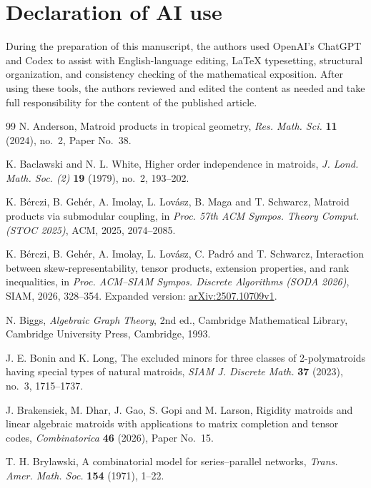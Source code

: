 \documentclass[12pt,a4paper]{article}
\numberwithin{equation}{section}
\theoremstyle{definition}
\theoremstyle{remark}
\begin{document}
\section*{Declaration of AI use}
During the preparation of this manuscript, the authors used OpenAI's ChatGPT and Codex to assist with English-language editing, \LaTeX{} typesetting, structural organization, and consistency checking of the mathematical exposition.  After using these tools, the authors reviewed and edited the content as needed and take full responsibility for the content of the published article.
\begin{thebibliography}{99}
\normalsize
{}
N. Anderson,
Matroid products in tropical geometry,
\emph{Res. Math. Sci.}
\textbf{11} (2024), no.~2, Paper No.~38.

K. Baclawski and N. L. White,
Higher order independence in matroids,
\emph{J. Lond. Math. Soc. (2)}
\textbf{19} (1979), no.~2, 193--202.

K. B\'erczi, B. Geh\'er, A. Imolay, L. Lov\'asz, B. Maga and T. Schwarcz,
Matroid products via submodular coupling,
in \emph{Proc. 57th ACM Sympos. Theory Comput. (STOC 2025)},
ACM, 2025, 2074--2085.

K. B\'erczi, B. Geh\'er, A. Imolay, L. Lov\'asz, C. Padr\'o and T. Schwarcz,
Interaction between skew-representability, tensor products, extension
properties, and rank inequalities,
in \emph{Proc. ACM--SIAM Sympos. Discrete Algorithms (SODA 2026)},
SIAM, 2026, 328--354.
Expanded version: \href{https://arxiv.org/abs/2507.10709v1}{arXiv:2507.10709v1}.

N. Biggs,
\emph{Algebraic Graph Theory}, 2nd ed.,
Cambridge Mathematical Library, Cambridge University Press, Cambridge, 1993.

J. E. Bonin and K. Long,
The excluded minors for three classes of 2-polymatroids having special
types of natural matroids,
\emph{SIAM J. Discrete Math.}
\textbf{37} (2023), no.~3, 1715--1737.

J. Brakensiek, M. Dhar, J. Gao, S. Gopi and M. Larson,
Rigidity matroids and linear algebraic matroids with applications to matrix
completion and tensor codes,
\emph{Combinatorica} \textbf{46} (2026), Paper No.~15.

T. H. Brylawski,
A combinatorial model for series--parallel networks,
\emph{Trans. Amer. Math. Soc.}
\textbf{154} (1971), 1--22.


\end{thebibliography}
\end{document}
